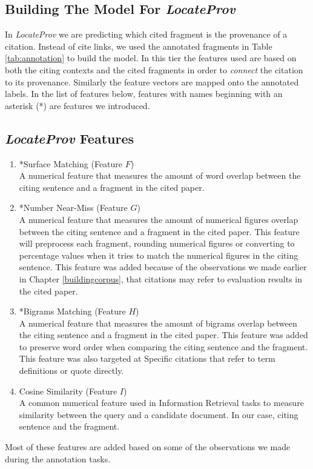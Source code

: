 \subsection*{Building The Model For {\it LocateProv}}
In {\it LocateProv} we are predicting which cited fragment is the provenance of a citation. Instead of cite links, we used the annotated fragments in Table \ref{tab:annotation} to build the model. In this tier the features used are based on both the citing contexts and the cited fragments in order to {\it connect} the citation to its provenance. Similarly the feature vectors are mapped onto the annotated labels. In the list of features below, features with names beginning with an asterisk (*) are features we introduced.

\subsection*{{\it LocateProv} Features}
\begin{enumerate}
\item *Surface Matching (Feature $F$)\\
A numerical feature that measures the amount of word overlap between the citing sentence and a fragment in the cited paper.

\item *Number Near-Miss (Feature $G$)\\
A numerical feature that measures the amount of numerical figures overlap between the citing sentence and a fragment in the cited paper. This feature will preprocess each fragment, rounding numerical figures or converting to percentage values when it tries to match the numerical figures in the citing sentence. This feature was added because of the observations we made earlier in Chapter \ref{buildingcorpus}, that citations may refer to evaluation results in the cited paper.

\item *Bigrams Matching (Feature $H$)\\
A numerical feature that measures the amount of bigrams overlap between the citing sentence and a fragment in the cited paper. This feature was added to preserve word order when comparing the citing sentence and the fragment. This feature was also targeted at Specific citations that refer to term definitions or quote directly.

\item Cosine Similarity (Feature $I$)\\
A common numerical feature used in Information Retrieval tasks to measure similarity between the query and a candidate document. In our case, citing sentence and the fragment.
\end{enumerate}
Most of these features are added based on some of the observations we made during the annotation tasks.


